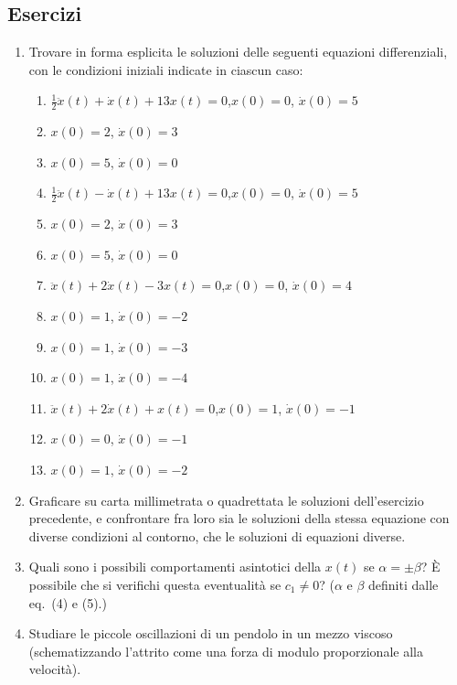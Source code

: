 \documentclass[11pt, a4paper]{book}
\numberwithin{equation}{section}
\newenvironment{esercizi}{\subsection*{Esercizi}\begin{enumerate}}{\end{enumerate}}
\begin{document}
\begin{esercizi}
    \item Trovare in forma esplicita le soluzioni delle seguenti equazioni
    differenziali, con le condizioni iniziali indicate in ciascun caso:
\begin{enumerate}
        \item $\tfrac{1}{2}\ddot{x}(t) + \dot{x}(t) + 13x(t) = 0$,\quad $x(0)=0$, $\dot{x}(0)=5$
        \item {}\quad $x(0)=2$, $\dot{x}(0)=3$
        \item {}\quad $x(0)=5$, $\dot{x}(0)=0$
        \item $\tfrac{1}{2}\ddot{x}(t) - \dot{x}(t) + 13x(t) = 0$,\quad $x(0)=0$, $\dot{x}(0)=5$
        \item {}\quad $x(0)=2$, $\dot{x}(0)=3$
        \item {}\quad $x(0)=5$, $\dot{x}(0)=0$
        \item $\ddot{x}(t) + 2\dot{x}(t) - 3x(t) = 0$,\quad $x(0)=0$, $\dot{x}(0)=4$
        \item {}\quad $x(0)=1$, $\dot{x}(0)=-2$
        \item {}\quad $x(0)=1$, $\dot{x}(0)=-3$
        \item {}\quad $x(0)=1$, $\dot{x}(0)=-4$
        \item $\ddot{x}(t) + 2\dot{x}(t) + x(t) = 0$,\quad $x(0)=1$, $\dot{x}(0)=-1$
        \item {}\quad $x(0)=0$, $\dot{x}(0)=-1$
        \item {}\quad $x(0)=1$, $\dot{x}(0)=-2$
    \end{enumerate}
    \item Graficare su carta millimetrata o quadrettata le soluzioni
    dell'esercizio precedente, e confrontare fra loro sia le soluzioni della
    stessa equazione con diverse condizioni al contorno, che le soluzioni di
    equazioni diverse.
    \item Quali sono i possibili comportamenti asintotici della $x(t)$ se
    $\alpha = \pm\beta$? È possibile che si verifichi questa eventualità se
    $c_1 \neq 0$? ($\alpha$ e $\beta$ definiti dalle eq.~(4) e (5).)
    \item Studiare le piccole oscillazioni di un pendolo in un mezzo viscoso
    (schematizzando l'attrito come una forza di modulo proporzionale alla
    velocità).
\end{esercizi}
\end{document}
